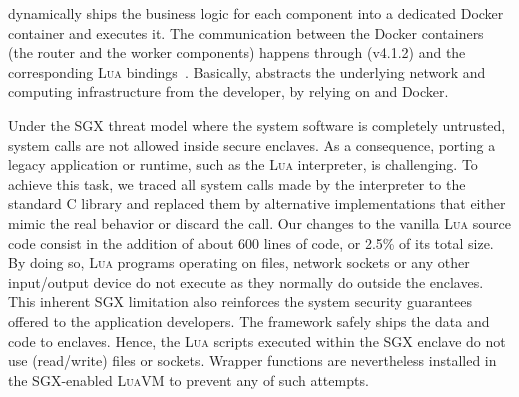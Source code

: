 \SYS{} dynamically ships the business logic for each component into a dedicated Docker container and executes it.
The communication between the Docker containers (the router and the worker components) happens through \zmq (v4.1.2) and the corresponding \textsc{Lua} bindings~\cite{github:lzmq}.
Basically, \SYS{} abstracts the underlying network and computing infrastructure from the developer, by relying on \zmq and Docker.

Under the SGX threat model where the system software is completely untrusted, system calls are not allowed inside secure enclaves.
As a consequence, porting a legacy application or runtime, such as the \textsc{Lua} interpreter, is challenging.
To achieve this task, we traced all system calls made by the interpreter to the standard C library and replaced them by alternative implementations that either mimic the real behavior or discard the call.
Our changes to the vanilla \textsc{Lua} source code consist in the addition of about $600$ lines of code, or 2.5\% of its total size.
By doing so, \textsc{Lua} programs operating on files, network sockets or any other input/output device do not execute as they normally do outside the enclaves. %
This inherent SGX limitation also reinforces the system security guarantees offered to the application developers.
The \SYS{} framework safely ships the data and code to enclaves.
Hence, the \textsc{Lua} scripts executed within the SGX enclave do not use (read/write) files or sockets.
Wrapper functions are nevertheless installed in the SGX-enabled \textsc{LuaVM} to prevent any of such attempts.

